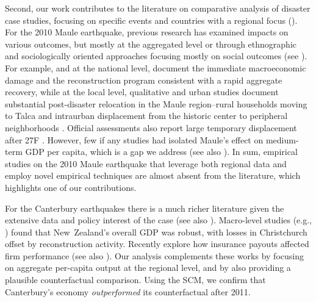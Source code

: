 \documentclass[12pt]{article}
\begin{document}
Second, our work contributes to the literature on comparative analysis of disaster case studies, focusing on specific events and countries with a regional focus (\cite{barone2014natural, farzanegan2025bam, porcelli2019impact}). For the 2010 Maule earthquake, previous research has examined impacts on various outcomes, but mostly at the aggregated level or through ethnographic and sociologically oriented approaches focusing mostly on social outcomes (see \cite{cardenasjiron2012chilean, eclac2010overview, cardenas2018talca, dussaillant2014trust}). For example, and at the national level, \textcite{eclac2010overview} document the immediate macroeconomic damage and the reconstruction program consistent with a rapid aggregate recovery, while at the local level, qualitative and urban studies document substantial post-disaster relocation in the Maule region--rural households moving to Talca and intraurban displacement from the historic center to peripheral neighborhoods \parencite{micheletti2017relocalizacion, cardenas2018talca}. Official assessments also report large temporary displacement after 27F \parencite{usgs2011ofr}. However, few if any studies had isolated Maule's effect on medium-term GDP per capita, which is a gap we address (see also \cite{aguirre2023medium}). In sum, empirical studies on the 2010 Maule earthquake that leverage both regional data and employ novel empirical techniques are almost absent from the literature, which highlights one of our contributions.   

For the Canterbury earthquakes there is a much richer literature given the extensive data and policy interest of the case (see also \cite{miller2013estimating}). Macro-level studies (e.g., \cite{doyle2015short, parker2016five}) found that New Zealand’s overall GDP was robust, with losses in Christchurch offset by reconstruction activity. Recently \textcite{poontirakul2017insurance} explore how insurance payouts affected firm performance (see also \cite{nguyen2020insurance}). Our analysis complements these works by focusing on aggregate per-capita output at the regional level, and by also providing a plausible counterfactual comparison. Using the SCM, we confirm that Canterbury’s economy \textit{outperformed} its counterfactual after 2011.
\end{document}
